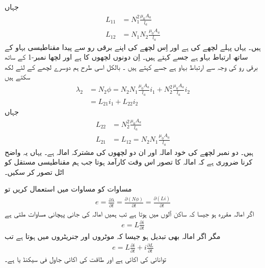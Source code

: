 جہاں
\begin{align}
L_{11}&=N_1^2  \frac{\mu_0 A_a}{l_a}\\
L_{12}&=N_1 N_2  \frac{\mu_0 A_a}{l_a}
\end{align}
ہیں۔ یہاں  پہلے لچھے کی    ہے اور   اِس لچھے کی اپنے برقی رو  سے پیدا مقناطیسی بہاو  کے ساتھ  ارتباط بہاو ہے جسے  کہتے ہیں۔  اِن دونوں لچھوں  کا   ہے اور    لچھا نمبر-1  کے ساتھ برقی رو   کی وجہ سے  ارتباط بہاو  ہے جسے   کہتے ہیں ۔ بالکل اسی طرح ہم دوسرے لچھے کے لئے لکھ سکتے ہیں
\begin{align}
\lambda_2&=N_2 \phi=N_2 N_1 \frac{\mu_0 A_a}{l_a} i_1+N_2^2 \frac{\mu_0 A_a}{l_a} i_2  \nonumber \\
&=L_{21} i_1+L_{22} i_2 \label{مساوات_مقناطیسی_دور_دوسرے_لچھے_کی_ارتباط}
\end{align}
جہاں
\begin{align}
L_{22}&=N_2^2 \frac{\mu_0 A_a}{l_a}\\
L_{21}&=L_{12}=N_2 N_1 \frac{\mu_0 A_a}{l_a} \label{مساوات_مقناطیسی_دور_مشترکہ_امالہ_یکساں}
\end{align}
ہیں۔ دو نمبر لچھے  کی خود امالہ اور   ان  دو لچھوں کی مشترکہ امالہ ہے۔ یہاں یہ واضح کرنا ضروری ہے کہ امالہ کا تصور اس وقت کارآمد ہوتا جب ہم مقناطیسی مستقل   کو اٹل تصور کر سکیں۔

مساوات   کو مساوات   میں استعمال کریں تو 
\begin{align}
e=\frac{\partial \lambda}{\partial t}=\frac{ \partial \left (N \phi \right)}{\partial t}=\frac{\partial \left( L i\right) }{\partial t}
\end{align}
اگر امالہ مقررہ ہو جیسا کہ ساکن آلوں میں ہوتا ہے تب ہمیں  امالہ کی جانی پہچانی مساوات ملتی ہے 
\begin{align}
e=L \frac{\partial i}{\partial t}
\end{align}
مگر اگر امالہ بھی تبدیل ہو جیسا کہ موٹروں اور جنریٹروں میں ہوتا ہے تب
\begin{align}
e= L \frac{\partial i}{\partial t} + i \frac{\partial L}{\partial t}
\end{align}
توانائی  کی اکائی   ہے اور طاقت  کی اکائی جاول فی سیکنڈ یا    ہے۔

